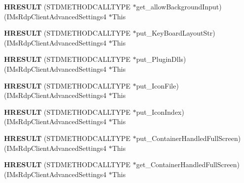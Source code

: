 \begin{DoxyCompactItemize}
{\bfseries H\+R\+E\+S\+U\+LT} (S\+T\+D\+M\+E\+T\+H\+O\+D\+C\+A\+L\+L\+T\+Y\+PE $\ast$get\+\_\+allow\+Background\+Input)(I\+Ms\+Rdp\+Client\+Advanced\+Settings4 $\ast$This
\item 
\mbox{\label{struct_i_ms_rdp_client_advanced_settings4_vtbl_a652a597b01b19d641fea689fe9eb5aac}} 
{\bfseries H\+R\+E\+S\+U\+LT} (S\+T\+D\+M\+E\+T\+H\+O\+D\+C\+A\+L\+L\+T\+Y\+PE $\ast$put\+\_\+\+Key\+Board\+Layout\+Str)(I\+Ms\+Rdp\+Client\+Advanced\+Settings4 $\ast$This
\item 
\mbox{\label{struct_i_ms_rdp_client_advanced_settings4_vtbl_a276d61d99569315e158535b6f018b48c}} 
{\bfseries H\+R\+E\+S\+U\+LT} (S\+T\+D\+M\+E\+T\+H\+O\+D\+C\+A\+L\+L\+T\+Y\+PE $\ast$put\+\_\+\+Plugin\+Dlls)(I\+Ms\+Rdp\+Client\+Advanced\+Settings4 $\ast$This
\item 
\mbox{\label{struct_i_ms_rdp_client_advanced_settings4_vtbl_a5eb12e04d7897bce27b7065a282681a9}} 
{\bfseries H\+R\+E\+S\+U\+LT} (S\+T\+D\+M\+E\+T\+H\+O\+D\+C\+A\+L\+L\+T\+Y\+PE $\ast$put\+\_\+\+Icon\+File)(I\+Ms\+Rdp\+Client\+Advanced\+Settings4 $\ast$This
\item 
\mbox{\label{struct_i_ms_rdp_client_advanced_settings4_vtbl_a0530a479c03429c9dd4565556e5a8c3f}} 
{\bfseries H\+R\+E\+S\+U\+LT} (S\+T\+D\+M\+E\+T\+H\+O\+D\+C\+A\+L\+L\+T\+Y\+PE $\ast$put\+\_\+\+Icon\+Index)(I\+Ms\+Rdp\+Client\+Advanced\+Settings4 $\ast$This
\item 
\mbox{\label{struct_i_ms_rdp_client_advanced_settings4_vtbl_a3793d0c91ddbf132879e1a882ca0a6fe}} 
{\bfseries H\+R\+E\+S\+U\+LT} (S\+T\+D\+M\+E\+T\+H\+O\+D\+C\+A\+L\+L\+T\+Y\+PE $\ast$put\+\_\+\+Container\+Handled\+Full\+Screen)(I\+Ms\+Rdp\+Client\+Advanced\+Settings4 $\ast$This
\item 
\mbox{\label{struct_i_ms_rdp_client_advanced_settings4_vtbl_a48c42cf24b2544b619a684e5c01b6659}} 
{\bfseries H\+R\+E\+S\+U\+LT} (S\+T\+D\+M\+E\+T\+H\+O\+D\+C\+A\+L\+L\+T\+Y\+PE $\ast$get\+\_\+\+Container\+Handled\+Full\+Screen)(I\+Ms\+Rdp\+Client\+Advanced\+Settings4 $\ast$This

\end{DoxyCompactItemize}
